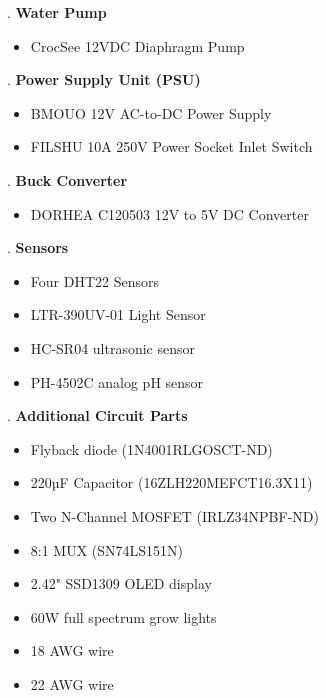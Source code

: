 \documentclass[12pt]{article} %
\begin{document}
. \textbf{Water Pump}
\begin{itemize}
    \item CrocSee 12VDC Diaphragm Pump
\end{itemize}

. \textbf{Power Supply Unit (PSU)} 
\begin{itemize}
    \item BMOUO 12V AC-to-DC Power Supply 
    \item FILSHU 10A 250V Power Socket Inlet Switch
\end{itemize}

. \textbf{Buck Converter}
\begin{itemize}
    \item DORHEA C120503 12V to 5V DC Converter
\end{itemize}

. \textbf{Sensors}
   \begin{itemize}
   \item Four DHT22 Sensors
   \item LTR-390UV-01 Light Sensor
   \item HC-SR04 ultrasonic sensor
   \item PH-4502C analog pH sensor
   \end{itemize}

. \textbf{Additional Circuit Parts}
   \begin{itemize}
   \item Flyback diode (1N4001RLGOSCT-ND)
   \item 220µF Capacitor (16ZLH220MEFCT16.3X11)
   \item Two N-Channel MOSFET (IRLZ34NPBF-ND)
   \item 8:1 MUX (SN74LS151N)
   \item 2.42" SSD1309 OLED display
   \item 60W full spectrum grow lights
   \item 18 AWG wire
   \item 22 AWG wire
   \end{itemize}
\end{document}
